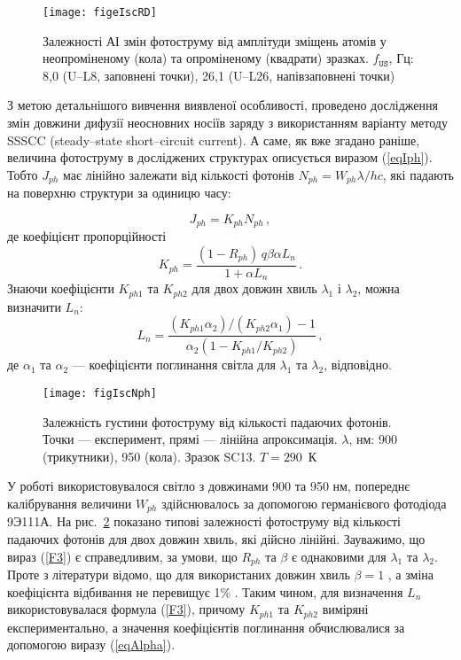 \begin{figure}
\center
\texttt{[image: figeIscRD]}
\caption{\label{figeIscRD}
Залежності АІ змін фотоструму від
амплітуди зміщень атомів у неопроміненому (кола)
та опроміненому (квадрати) зразках.
$f_\mathtt{US}$, Гц: 8,0 (U--L8, заповнені точки),
26,1 (U--L26, напівзаповнені точки)
}%
\end{figure}

З метою детальнішого вивчення виявленої особливості, проведено дослідження змін
довжини дифузії неосновних носіїв заряду з використанням
варіанту методу SSSCC (steady--state short--circuit current)\cite{Schroder2006}.
А саме, як вже згадано раніше, величина фотоструму в досліджених структурах
описується виразом (\ref{eqIph}).
Тобто $J_{ph}$ має лінійно залежати від кількості фотонів
\mbox{$N_{ph}=W_{ph}\lambda /hc$}, які падають на поверхню структури за одиницю часу:

\begin{equation}
J_{ph}=K_{ph}N_{ph}\,,
\end{equation}
де коефіцієнт пропорційності
\begin{equation}
 K_{ph}=\frac{(1-R_{ph})\,q\beta \alpha L_n} {1+\alpha L_n}\,.
\end{equation}
Знаючи коефіцієнти $K_{ph1}$ та $K_{ph2}$
для двох довжин хвиль $\lambda_1$ і $\lambda_2$, можна
визначити $L_n$:
\begin{equation}\label{F3}
L_n=\frac{(K_{ph1}\alpha_2)/(K_{ph2}\alpha_1)-1}{\alpha_2(1-K_{ph1}/K_{ph2})}\,,
\end{equation}
де $\alpha_1$ та $\alpha_2$ --- коефіцієнти поглинання світла для $\lambda_1$ та $\lambda_2$, відповідно.

\begin{figure}[b]
\center
\texttt{[image: figIscNph]}
\caption{\label{figIscNph}
Залежність густини фотоструму від кількості падаючих фотонів.
Точки --- експеримент, прямі --- лінійна апроксимація.
$\lambda$, нм: 900 (трикутники), 950 (кола). Зразок SC13. $T = 290$~К
}%
\end{figure}

У роботі використовувалося світло з довжинами 900 та 950 нм,
попереднє калібрування величини $W_{ph}$ здійснювалось
за допомогою германієвого фотодіода 9Э111А.
На рис.~\ref{figIscNph} показано типові залежності фотоструму від
кількості падаючих фотонів для двох довжин хвиль,
які дійсно лінійні.
Зауважимо, що вираз (\ref{F3}) є справедливим,
за умови, що $R_{ph}$ та $\beta$ є однаковими для $\lambda_1$ та $\lambda_2$.
Проте з літератури відомо, що для використаних довжин хвиль
$\beta=1$ \cite{Gaman}, а зміна коефіцієнта відбивання не перевищує 1\% \cite{GreenOptic,SiOptic:JAP1998,GreenOptic2}.
Таким чином, для визначення $L_n$ використовувалася формула (\ref{F3}),
причому $K_{ph1}$ та $K_{ph2}$ виміряні експериментально, а значення
коефіцієнтів поглинання обчислювалися за допомогою виразу (\ref{eqAlpha}).






